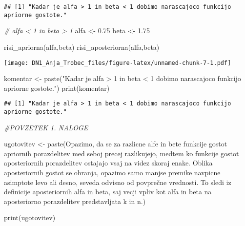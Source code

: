 \documentclass[
]{article}
\newenvironment{Shaded}{\begin{snugshade}}{\end{snugshade}}
\newcommand{\CommentTok}[1]{\textcolor[rgb]{0.56,0.35,0.01}{\textit{#1}}}
\newcommand{\FloatTok}[1]{\textcolor[rgb]{0.00,0.00,0.81}{#1}}
\newcommand{\FunctionTok}[1]{\textcolor[rgb]{0.00,0.00,0.00}{#1}}
\newcommand{\NormalTok}[1]{#1}
\newcommand{\OtherTok}[1]{\textcolor[rgb]{0.56,0.35,0.01}{#1}}
\newcommand{\StringTok}[1]{\textcolor[rgb]{0.31,0.60,0.02}{#1}}
\begin{document}
\begin{verbatim}
## [1] "Kadar je alfa > 1 in beta < 1 dobimo narascajoco funkcijo apriorne gostote."
\end{verbatim}

\begin{Shaded}
\begin{Highlighting}[]
\CommentTok{\# alfa \textless{} 1 in beta \textgreater{} 1}
\NormalTok{alfa }\OtherTok{\textless{}{-}} \FloatTok{0.75}
\NormalTok{beta }\OtherTok{\textless{}{-}} \FloatTok{1.75}

\FunctionTok{risi\_apriorna}\NormalTok{(alfa,beta)}
\FunctionTok{risi\_aposteriorna}\NormalTok{(alfa,beta)}
\end{Highlighting}
\end{Shaded}

\texttt{[image: DN1\_Anja\_Trobec\_files/figure-latex/unnamed-chunk-7-1.pdf]}

\begin{Shaded}
\begin{Highlighting}[]
\NormalTok{komentar }\OtherTok{\textless{}{-}} \FunctionTok{paste}\NormalTok{(}\StringTok{"Kadar je alfa \textgreater{} 1 in beta \textless{} 1 dobimo narascajoco funkcijo apriorne gostote."}\NormalTok{)}
\FunctionTok{print}\NormalTok{(komentar)}
\end{Highlighting}
\end{Shaded}

\begin{verbatim}
## [1] "Kadar je alfa > 1 in beta < 1 dobimo narascajoco funkcijo apriorne gostote."
\end{verbatim}

\begin{Shaded}
\begin{Highlighting}[]
\CommentTok{\#POVZETEK 1. NALOGE}

\NormalTok{ugotovitev }\OtherTok{\textless{}{-}} \FunctionTok{paste}\NormalTok{(}\StringTok{\textquotesingle{}Opazimo, da se za razlicne alfe in bete funkcije gostot apriornih porazdelitev med seboj precej razlikujejo, medtem ko funkcije gostot aposteriornih porazdelitev ostajajo vsaj na videz skoraj enake. Oblika aposteriornih gostot se ohranja, opazimo samo manjse premike navpicne asimptote levo ali desno, seveda odvisno od povprečne vrednosti. To sledi iz definicije aposteriornih alfa in beta, saj vecji vpliv kot alfa in beta na aposteriorno porazdelitev predstavljata k in n.\textquotesingle{}}\NormalTok{)}

\FunctionTok{print}\NormalTok{(ugotovitev)}
\end{Highlighting}
\end{Shaded}
\end{document}
